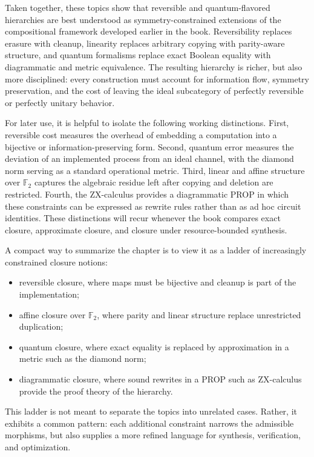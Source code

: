 \documentclass[11pt]{article}
\begin{document}
Taken together, these topics show that reversible and quantum-flavored hierarchies are best understood as symmetry-constrained extensions of the compositional framework developed earlier in the book. Reversibility replaces erasure with cleanup, linearity replaces arbitrary copying with parity-aware structure, and quantum formalisms replace exact Boolean equality with diagrammatic and metric equivalence. The resulting hierarchy is richer, but also more disciplined: every construction must account for information flow, symmetry preservation, and the cost of leaving the ideal subcategory of perfectly reversible or perfectly unitary behavior.

For later use, it is helpful to isolate the following working distinctions. First, reversible cost measures the overhead of embedding a computation into a bijective or information-preserving form. Second, quantum error measures the deviation of an implemented process from an ideal channel, with the diamond norm serving as a standard operational metric. Third, linear and affine structure over \(\mathbb{F}_2\) captures the algebraic residue left after copying and deletion are restricted. Fourth, the ZX-calculus provides a diagrammatic PROP in which these constraints can be expressed as rewrite rules rather than as ad hoc circuit identities. These distinctions will recur whenever the book compares exact closure, approximate closure, and closure under resource-bounded synthesis.

A compact way to summarize the chapter is to view it as a ladder of increasingly constrained closure notions:
\begin{itemize}
  \item reversible closure, where maps must be bijective and cleanup is part of the implementation;
  \item affine closure over \(\mathbb{F}_2\), where parity and linear structure replace unrestricted duplication;
  \item quantum closure, where exact equality is replaced by approximation in a metric such as the diamond norm;
  \item diagrammatic closure, where sound rewrites in a PROP such as ZX-calculus provide the proof theory of the hierarchy.
\end{itemize}
This ladder is not meant to separate the topics into unrelated cases. Rather, it exhibits a common pattern: each additional constraint narrows the admissible morphisms, but also supplies a more refined language for synthesis, verification, and optimization.
\end{document}
